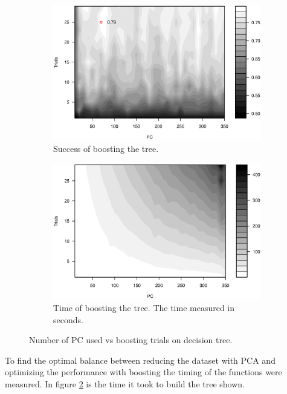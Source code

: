\begin{figure}[H]
\centering
    \begin{subfigure}{0.49\textwidth}
        \includegraphics[width=\textwidth]{graphics/tree_pca_vs_boost_success}
        \caption{Success of boosting the tree.}
        \label{fig:tree_pca_boost}
    \end{subfigure}
    \begin{subfigure}{0.49\textwidth}
        \includegraphics[width=\textwidth]{graphics/tree_pca_vs_boost_time}
        \caption{Time of boosting the tree. The time measured in seconds.}
        \label{fig:tree_pca_boost_timing}
    \end{subfigure}
\caption{Number of PC used vs boosting trials on decision tree.}
\label{fig:tree_pca_boost}
\end{figure}

To find the optimal balance between reducing the dataset with PCA and optimizing the performance with boosting the timing of the functions were measured.
In figure \ref{fig:tree_pca_boost_timing} is the time it took to build the tree shown.


